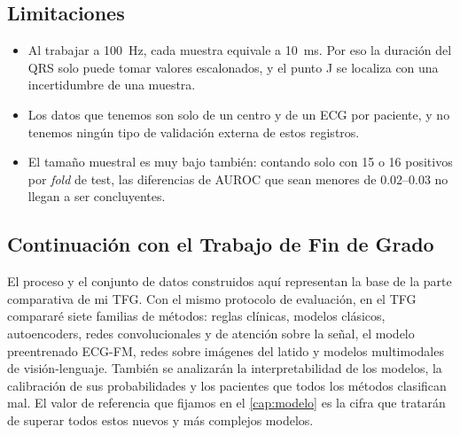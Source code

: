 \subsection{Limitaciones}

\begin{itemize}
  \item Al trabajar a \SI{100}{\hertz}, cada muestra equivale a \SI{10}{\milli\second}. Por eso la duración del QRS solo puede tomar valores escalonados, y el punto J se localiza con una incertidumbre de una muestra.
  \item Los datos que tenemos son solo de un centro y de un ECG por paciente, y no tenemos ningún tipo de validación externa de estos registros.
  \item El tamaño muestral es muy bajo también: contando solo con 15 o 16 positivos por \emph{fold} de test, las diferencias de AUROC que sean menores de \numrange{0.02}{0.03} no llegan a ser concluyentes.
\end{itemize}

\subsection{Continuación con el Trabajo de Fin de Grado}

El proceso y el conjunto de datos construidos aquí representan la base de la parte comparativa de mi TFG. Con el mismo protocolo de evaluación, en el TFG compararé siete familias de métodos: reglas clínicas, modelos clásicos, autoencoders, redes convolucionales y de atención sobre la señal, el modelo preentrenado ECG-FM, redes sobre imágenes del latido y modelos multimodales de visión-lenguaje. También se analizarán la interpretabilidad de los modelos, la calibración de sus probabilidades y los pacientes que todos los métodos clasifican mal. El valor de referencia que fijamos en el \cref{cap:modelo} es la cifra que tratarán de superar todos estos nuevos y más complejos modelos.
